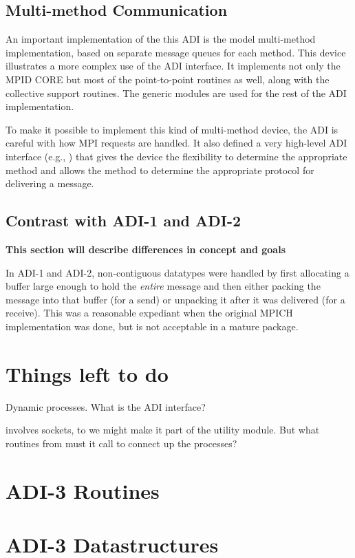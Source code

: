 \documentclass{article}
\begin{document}
\subsection{Multi-method Communication}
An important implementation of the this ADI is the model multi-method
implementation, based on separate message queues for each method.
This device illustrates a more complex use of the ADI interface.  It
implements not only the MPID CORE but most of the point-to-point
routines as well, along with the collective support routines.  The
generic modules are used for the rest of the ADI implementation.

To make it possible to implement this kind of multi-method device, the
ADI is careful with how MPI requests are handled.  It also defined a
very high-level ADI interface (e.g., ) that gives the
device the flexibility to determine the appropriate method and allows
the method to determine the appropriate protocol for delivering a message.

\subsection{Contrast with ADI-1 and ADI-2}
\label{sec-historical}
\textbf{This section will describe differences in concept and goals}

In ADI-1 and ADI-2, non-contiguous datatypes were handled by first
allocating a buffer large enough to hold the \emph{entire} message and
then either packing the message into that buffer (for a send) or
unpacking it after it was delivered (for a receive).  This was a
reasonable expediant when the original MPICH implementation was done,
but is not acceptable in a mature package.

\section{Things left to do}
Dynamic processes.  What is the ADI interface?

 involves sockets, to we might make it part of the
utility module.  But what routines from  must it call
to connect up the processes?

\section{ADI-3 Routines}


\section{ADI-3 Datastructures}

\end{document}
